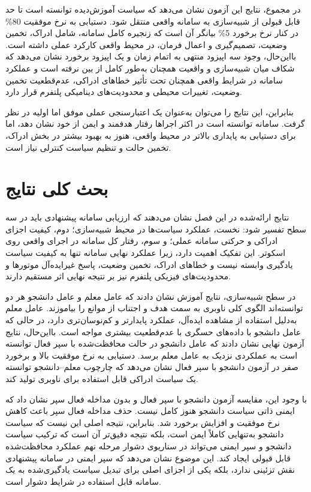 در مجموع، نتایج این آزمون نشان می‌دهد که سیاست آموزش‌دیده توانسته است تا حد قابل قبولی از شبیه‌سازی به سامانه واقعی منتقل شود. دستیابی به نرخ موفقیت 80\% در کنار نرخ برخورد 5\% بیانگر آن است که زنجیره کامل سامانه، شامل ادراک، تخمین وضعیت، تصمیم‌گیری و اعمال فرمان، در محیط واقعی کارکرد عملی داشته است. بااین‌حال، وجود سه اپیزود منتهی به اتمام زمان و یک اپیزود برخورد نشان می‌دهد که شکاف میان شبیه‌سازی و واقعیت همچنان به‌طور کامل از بین نرفته است و عملکرد سامانه در شرایط واقعی همچنان تحت تأثیر خطاهای ادراکی، عدم‌قطعیت تخمین وضعیت، تغییرات محیطی و محدودیت‌های دینامیکی پلتفرم قرار دارد.

بنابراین، این نتایج را می‌توان به‌عنوان یک اعتبارسنجی عملی موفق اما اولیه در نظر گرفت. سامانه توانسته است در اکثر اجراها رفتار هدفمند و ایمن از خود نشان دهد، اما برای دستیابی به پایداری بالاتر در محیط واقعی، هنوز به بهبود بیشتر در بخش ادراک، تخمین حالت و تنظیم سیاست کنترلی نیاز است.

\section{بحث کلی نتایج}
\label{sec:chapter6_general_discussion}

نتایج ارائه‌شده در این فصل نشان می‌دهند که ارزیابی سامانه پیشنهادی باید در سه سطح تفسیر شود: نخست، عملکرد سیاست‌ها در محیط شبیه‌سازی؛ دوم، کیفیت اجزای ادراکی و حرکتی سامانه عملی؛ و سوم، رفتار کل سامانه در اجرای واقعی روی اسکوتر. این تفکیک اهمیت دارد، زیرا عملکرد نهایی سامانه تنها به کیفیت سیاست یادگیری وابسته نیست و خطاهای ادراک، تخمین وضعیت، پاسخ غیرایده‌آل موتورها و محدودیت‌های فیزیکی پلتفرم نیز بر نتیجه نهایی اثر مستقیم دارند.

در سطح شبیه‌سازی، نتایج آموزش نشان دادند که عامل معلم و عامل دانشجو هر دو توانسته‌اند الگوی کلی ناوبری به سمت هدف و اجتناب از موانع را بیاموزند. عامل معلم به‌دلیل استفاده از مشاهده ایده‌آل، عملکرد پایدارتر و کم‌نوسان‌تری دارد، در حالی که عامل دانشجو با داده‌های حسگری با عدم‌قطعیت بیشتری مواجه است. بااین‌حال، نتایج آزمون نهایی نشان دادند که عامل دانشجو در حالت محافظت‌شده با سپر فعال توانسته است به عملکردی نزدیک به عامل معلم برسد. دستیابی به نرخ موفقیت بالا و برخورد صفر در آزمون دانشجو با سپر فعال نشان می‌دهد که چارچوب معلم--دانشجو توانسته یک سیاست ادراکی قابل استفاده برای ناوبری تولید کند.

با وجود این، مقایسه آزمون دانشجو با سپر فعال و بدون مداخله فعال سپر نشان داد که ایمنی ذاتی سیاست دانشجو هنوز کامل نیست. حذف مداخله فعال سپر باعث کاهش نرخ موفقیت و افزایش برخورد شد. بنابراین، نتیجه اصلی این نیست که سیاست دانشجو به‌تنهایی کاملاً ایمن است، بلکه نتیجه دقیق‌تر آن است که ترکیب سیاست دانشجو و سپر ایمنی می‌تواند در سناریوی دشوار مرحله نهم عملکرد محافظت‌شده قابل قبولی ایجاد کند. این موضوع نشان می‌دهد که سپر ایمنی در سامانه پیشنهادی نقش تزئینی ندارد، بلکه یکی از اجزای اصلی برای تبدیل سیاست یادگیری‌شده به یک سامانه قابل استفاده در شرایط دشوار است.


